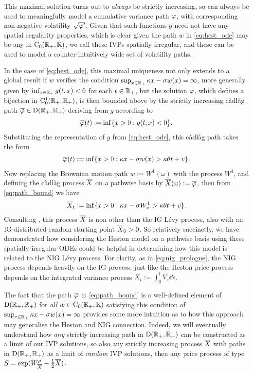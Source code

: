 This maximal solution turns out to \emph{always} be strictly increasing, so can always be used to meaningfully model a cumulative variance path $\varphi$, with corresponding non-negative volatility $\sqrt{\varphi'}$. Given that such functions $g$ need not have any spatial regularity properties, which is clear given the path $w$ in \autoref{eq:hest_ode} may be any in $\mathrm{C}_0(\mathbb{R}_+,\mathbb{R})$, we call these IVPs spatially irregular, and these can be used to model a counter-intuitively wide set of volatility paths.

In the case of \autoref{eq:hest_ode}, this maximal uniqueness not only extends to a global result if $w$ verifies the condition $\sup_{x\in\mathbb{R}_+}\kappa x - \sigma w(x) = \infty$, more generally given by $\inf_{x\in\mathbb{R}_+}g(t,x)<0$ for each $t\in\mathbb{R}_+$, but the solution $\varphi$, which defines a bijection in $\mathrm{C}^1_0(\mathbb{R}_+,\mathbb{R}_+)$, is then bounded above by the strictly increasing c\`adl\`ag path $\overline{\varphi}\in\mathrm{D}(\mathbb{R}_+,\mathbb{R}_+)$ deriving from $g$ according to
\begin{equation}\label{eq:cadlag_bound_intro}
    \overline{\varphi}(t) := \inf\{x>0:g(t,x)<0\}.
\end{equation}
Substituting the representation of $g$ from \autoref{eq:hest_ode}, this c\`adl\`ag path takes the form
\begin{equation}\label{eq:path_bound}
    \overline{\varphi}(t) := \inf\{x>0: \kappa x - \sigma w(x) > \kappa\theta t + v\}.
\end{equation}
Now replacing the Brownian motion path $w := W^1(\omega)$ with the process $W^1$, and defining the c\`adl\`ag process ${\overline{X}}$ on a pathwise basis by ${\overline{X}}(\omega):=\overline{\varphi}$, then from \autoref{eq:path_bound} we have
\begin{equation}\label{eq:ig_intro}
    {\overline{X}}_t := \inf\{x>0: \kappa x - \sigma W^1_x > \kappa\theta t + v\}.
\end{equation}
Consulting \cite{applebaum_2009}, this process ${\overline{X}}$ is non other than the IG L\'evy process, also with an IG-distributed random starting point ${\overline{X}}_0>0$. So relatively succinctly, we have demonstrated how considering the Heston model on a pathwise basis using these spatially irregular ODEs could be helpful in determining how this model is related to the NIG L\'evy process. For clarity, as in \autoref{eq:nig_prologue}, the NIG process depends heavily on the IG process, just like the Heston price process depends on the integrated variance process $X_t:=\int_0^t V_s\dd s$.

The fact that the path $\overline{\varphi}$ in \autoref{eq:path_bound} is a well-defined element of $\mathrm{D}(\mathbb{R}_+,\mathbb{R}_+)$ for \emph{all} $w\in\mathrm{C}_0(\mathbb{R}_+,\mathbb{R})$ satisfying this condition of $\sup_{x\in\mathbb{R}_+}\kappa x - \sigma w(x) = \infty$ provides some more intuition as to how this approach may generalise the Heston and NIG connection. Indeed, we will eventually understand how \emph{any} strictly increasing path in $\mathrm{D}(\mathbb{R}_+,\mathbb{R}_+)$ can be constructed as a limit of our IVP solutions, so also any strictly increasing process ${\overline{X}}$ with paths in $\mathrm{D}(\mathbb{R}_+,\mathbb{R}_+)$ as a limit of \emph{random} IVP solutions, then any price process of type $S=\exp(W^\rho_{\overline{X}}-\frac12 {\overline{X}})$.


